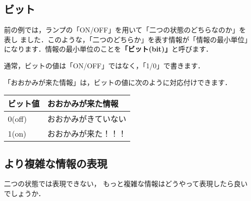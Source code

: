 \begin{center}
\end{center}

\subsection{ビット}

前の例では，ランプの「ON/OFF」を用いて「二つの状態のどちらなのか」を表し
ました．このような，「二つのどちらか」を表す情報が「情報の最小単位」
になります．情報の最小単位のことを{\bf 「ビット(bit)」}と呼びます．

\begin{center}
\end{center}

通常，ビットの値は「ON/OFF」ではなく，「1/0」で書きます．
\begin{center}
{\small
{}}
\end{center}

「おおかみが来た情報」は，ビットの値に次のように対応付けできます．

\begin{center}
\begin{tabular}{|l|l|} \hline
ビット値 & おおかみが来た情報 \\
\hline
0(off) & おおかみがきていない \\
1(on)  & おおかみが来た！！！ \\
\hline
\end{tabular}
\end{center}

\subsection{より複雑な情報の表現}

二つの状態では表現できない，
もっと複雑な情報はどうやって表現したら良いでしょうか．


